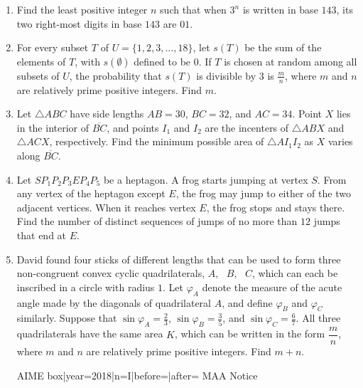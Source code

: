 \documentclass{article}
\begin{document}
\begin{enumerate}[label=\arabic*., itemsep=0.5em]
\par \vspace{0.5em}\item Find the least positive integer \(n\) such that when \(3^n\) is written in base \(143\), its two right-most digits in base \(143\) are \(01\).\par \vspace{0.5em}\item For every subset \(T\) of \(U = \{ 1,2,3,\ldots,18 \}\), let \(s(T)\) be the sum of the elements of \(T\), with \(s(\emptyset)\) defined to be \(0\). If \(T\) is chosen at random among all subsets of \(U\), the probability that \(s(T)\) is divisible by \(3\) is \(\frac{m}{n}\), where \(m\) and \(n\) are relatively prime positive integers. Find \(m\).\par \vspace{0.5em}\item Let \(\triangle ABC\) have side lengths \(AB=30\), \(BC=32\), and \(AC=34\). Point \(X\) lies in the interior of \(\overline{BC}\), and points \(I_1\) and \(I_2\) are the incenters of \(\triangle ABX\) and \(\triangle ACX\), respectively. Find the minimum possible area of \(\triangle AI_1I_2\) as \(X\) varies along \(\overline{BC}\).\par \vspace{0.5em}\item Let \(SP_1P_2P_3EP_4P_5\) be a heptagon. A frog starts jumping at vertex \(S\). From any vertex of the heptagon except \(E\), the frog may jump to either of the two adjacent vertices. When it reaches vertex \(E\), the frog stops and stays there. Find the number of distinct sequences of jumps of no more than \(12\) jumps that end at \(E\).\par \vspace{0.5em}\item David found four sticks of different lengths that can be used to form three non-congruent convex cyclic quadrilaterals, \(A,\text{ }B,\text{ }C\), which can each be inscribed in a circle with radius \(1\). Let \(\varphi_A\) denote the measure of the acute angle made by the diagonals of quadrilateral \(A\), and define \(\varphi_B\) and \(\varphi_C\) similarly. Suppose that \(\sin\varphi_A=\frac{2}{3}\), \(\sin\varphi_B=\frac{3}{5}\), and \(\sin\varphi_C=\frac{6}{7}\). All three quadrilaterals have the same area \(K\), which can be written in the form \(\dfrac{m}{n}\), where \(m\) and \(n\) are relatively prime positive integers. Find \(m+n\).



{{AIME box|year=2018|n=I|before=|after=}}
{{MAA Notice}}\par \vspace{0.5em}\end{enumerate}
\end{document}
